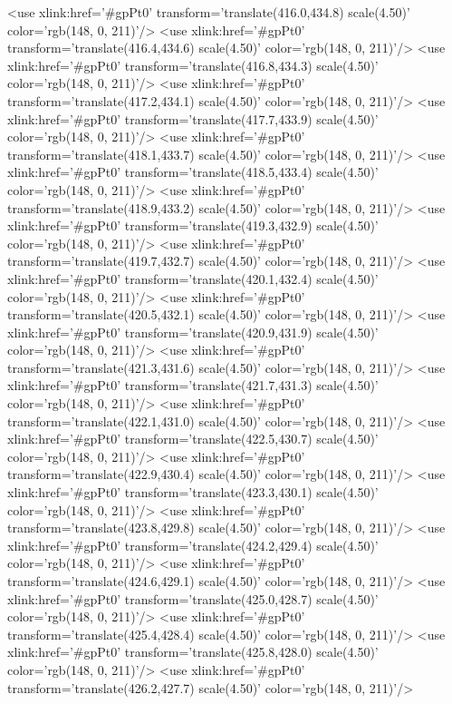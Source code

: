 	<use xlink:href='#gpPt0' transform='translate(416.0,434.8) scale(4.50)' color='rgb(148,   0, 211)'/>
	<use xlink:href='#gpPt0' transform='translate(416.4,434.6) scale(4.50)' color='rgb(148,   0, 211)'/>
	<use xlink:href='#gpPt0' transform='translate(416.8,434.3) scale(4.50)' color='rgb(148,   0, 211)'/>
	<use xlink:href='#gpPt0' transform='translate(417.2,434.1) scale(4.50)' color='rgb(148,   0, 211)'/>
	<use xlink:href='#gpPt0' transform='translate(417.7,433.9) scale(4.50)' color='rgb(148,   0, 211)'/>
	<use xlink:href='#gpPt0' transform='translate(418.1,433.7) scale(4.50)' color='rgb(148,   0, 211)'/>
	<use xlink:href='#gpPt0' transform='translate(418.5,433.4) scale(4.50)' color='rgb(148,   0, 211)'/>
	<use xlink:href='#gpPt0' transform='translate(418.9,433.2) scale(4.50)' color='rgb(148,   0, 211)'/>
	<use xlink:href='#gpPt0' transform='translate(419.3,432.9) scale(4.50)' color='rgb(148,   0, 211)'/>
	<use xlink:href='#gpPt0' transform='translate(419.7,432.7) scale(4.50)' color='rgb(148,   0, 211)'/>
	<use xlink:href='#gpPt0' transform='translate(420.1,432.4) scale(4.50)' color='rgb(148,   0, 211)'/>
	<use xlink:href='#gpPt0' transform='translate(420.5,432.1) scale(4.50)' color='rgb(148,   0, 211)'/>
	<use xlink:href='#gpPt0' transform='translate(420.9,431.9) scale(4.50)' color='rgb(148,   0, 211)'/>
	<use xlink:href='#gpPt0' transform='translate(421.3,431.6) scale(4.50)' color='rgb(148,   0, 211)'/>
	<use xlink:href='#gpPt0' transform='translate(421.7,431.3) scale(4.50)' color='rgb(148,   0, 211)'/>
	<use xlink:href='#gpPt0' transform='translate(422.1,431.0) scale(4.50)' color='rgb(148,   0, 211)'/>
	<use xlink:href='#gpPt0' transform='translate(422.5,430.7) scale(4.50)' color='rgb(148,   0, 211)'/>
	<use xlink:href='#gpPt0' transform='translate(422.9,430.4) scale(4.50)' color='rgb(148,   0, 211)'/>
	<use xlink:href='#gpPt0' transform='translate(423.3,430.1) scale(4.50)' color='rgb(148,   0, 211)'/>
	<use xlink:href='#gpPt0' transform='translate(423.8,429.8) scale(4.50)' color='rgb(148,   0, 211)'/>
	<use xlink:href='#gpPt0' transform='translate(424.2,429.4) scale(4.50)' color='rgb(148,   0, 211)'/>
	<use xlink:href='#gpPt0' transform='translate(424.6,429.1) scale(4.50)' color='rgb(148,   0, 211)'/>
	<use xlink:href='#gpPt0' transform='translate(425.0,428.7) scale(4.50)' color='rgb(148,   0, 211)'/>
	<use xlink:href='#gpPt0' transform='translate(425.4,428.4) scale(4.50)' color='rgb(148,   0, 211)'/>
	<use xlink:href='#gpPt0' transform='translate(425.8,428.0) scale(4.50)' color='rgb(148,   0, 211)'/>
	<use xlink:href='#gpPt0' transform='translate(426.2,427.7) scale(4.50)' color='rgb(148,   0, 211)'/>
